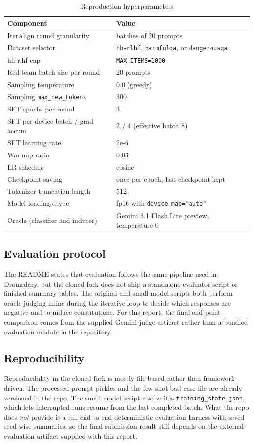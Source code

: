 \documentclass[11pt]{article}
\begin{document}
\begin{table}[h]
\centering
\caption{Reproduction hyperparameters}
\label{tab:hparams}
\begin{tabular}{ll}
\toprule
Component & Value \\
\midrule
IterAlign round granularity & batches of 20 prompts \\
Dataset selector & \texttt{hh-rlhf}, \texttt{harmfulqa}, or \texttt{dangerousqa} \\
hh-rlhf cap & \texttt{MAX\_ITEMS=1000} \\
Red-team batch size per round & 20 prompts \\
Sampling temperature & 0.0 (greedy) \\
Sampling \texttt{max\_new\_tokens} & 300 \\
SFT epochs per round & 3 \\
SFT per-device batch / grad accum & 2 / 4 (effective batch 8) \\
SFT learning rate & 2e-6 \\
Warmup ratio & 0.03 \\
LR schedule & cosine \\
Checkpoint saving & once per epoch, last checkpoint kept \\
Tokenizer truncation length & 512 \\
Model loading dtype & fp16 with \texttt{device\_map="auto"} \\
Oracle (classifier and inducer) & Gemini 3.1 Flash Lite preview, temperature 0 \\
\bottomrule
\end{tabular}
\end{table}

\subsection{Evaluation protocol}
The README states that evaluation follows the same pipeline used in Dromedary, but the cloned fork does not ship a standalone evaluator script or finished summary tables. The original and small-model scripts both perform oracle judging inline during the iterative loop to decide which responses are negative and to induce constitutions. For this report, the final end-point comparison comes from the supplied Gemini-judge artifact rather than a bundled evaluation module in the repository.

\subsection{Reproducibility}
Reproducibility in the cloned fork is mostly file-based rather than framework-driven. The processed prompt pickles and the few-shot bad-case file are already versioned in the repo. The small-model script also writes \texttt{training\_state.json}, which lets interrupted runs resume from the last completed batch. What the repo does \emph{not} provide is a full end-to-end deterministic evaluation harness with saved seed-wise summaries, so the final submission result still depends on the external evaluation artifact supplied with this report.
\end{document}
